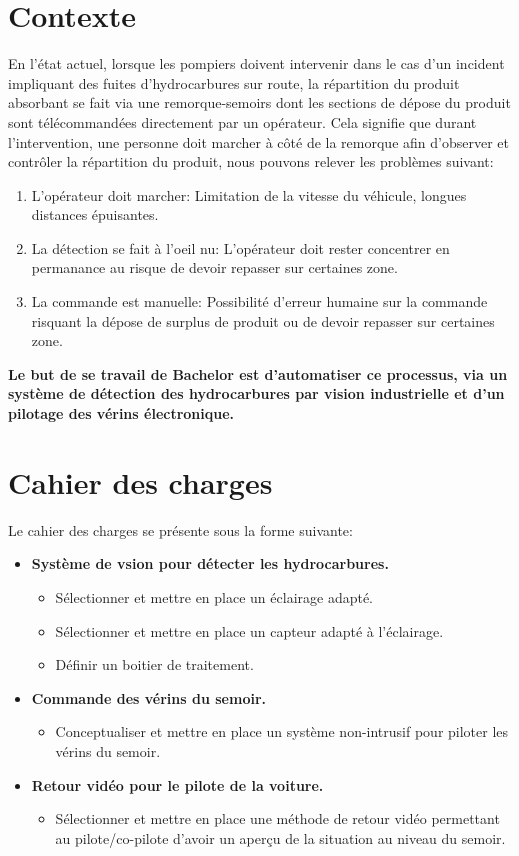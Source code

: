 \section{Contexte}
En l'état actuel, lorsque les pompiers doivent intervenir dans le cas d'un incident impliquant des fuites d'hydrocarbures sur route, la répartition
du produit absorbant se fait via une remorque-semoirs dont les sections de dépose du produit sont télécommandées directement par un opérateur.
Cela signifie que durant l'intervention, une personne doit marcher à côté de la remorque afin d'observer et contrôler la répartition du produit, nous pouvons relever les problèmes suivant:
\begin{enumerate}
    \item L'opérateur doit marcher: Limitation de la vitesse du véhicule, longues distances épuisantes.
    \item La détection se fait à l'oeil nu: L'opérateur doit rester concentrer en permanance au risque de devoir repasser sur certaines zone.
    \item La commande est manuelle: Possibilité d'erreur humaine sur la commande risquant la dépose de surplus de produit ou de devoir repasser sur certaines zone.
\end{enumerate}
\textbf{Le but de se travail de Bachelor est d'automatiser ce processus, via un système de détection des hydrocarbures par vision industrielle et d'un pilotage des vérins électronique.}
\section{Cahier des charges \label{cdc}}
Le cahier des charges se présente sous la forme suivante:
\begin{itemize}
    \item \textbf{Système de vsion pour détecter les hydrocarbures.}
          \begin{itemize}
              \item Sélectionner et mettre en place un éclairage adapté.
              \item Sélectionner et mettre en place un capteur adapté à l'éclairage.
              \item Définir un boitier de traitement.
          \end{itemize}
    \item \textbf{Commande des vérins du semoir.}
          \begin{itemize}
              \item Conceptualiser et mettre en place un système non-intrusif pour piloter les vérins du semoir.
          \end{itemize}
    \item \textbf{Retour vidéo pour le pilote de la voiture.}
          \begin{itemize}
              \item Sélectionner et mettre en place une méthode de retour vidéo permettant au pilote/co-pilote d'avoir un aperçu de la situation au niveau du semoir.
          \end{itemize}
\end{itemize}
